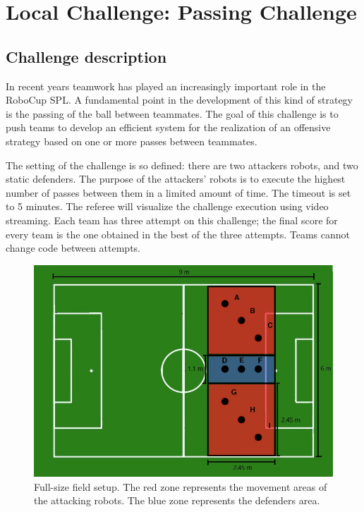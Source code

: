 \section{Local Challenge: Passing Challenge}
\label{sec:PassingChallenge}

\subsection{Challenge description}
In recent years teamwork has played an increasingly important role in the RoboCup SPL. A fundamental point in the development of this kind of strategy is the passing of the ball between teammates. The goal of this challenge is to push teams to develop an efficient system for the realization of an offensive strategy based on one or more passes between teammates. 

The setting of the challenge is so defined: there are two attackers robots, and two static defenders. The purpose of the attackers' robots is to execute the highest number of passes between them in a limited amount of time. The timeout is set to 5 minutes.
The referee will visualize the challenge execution using video streaming. 
Each team has three attempt on this challenge; the final score for every team is the one obtained in the best of the three attempts. Teams cannot change code between attempts.
\begin{figure}[ht]
\includegraphics[width=0.95\linewidth]{figs/ch_2_full.jpg}
\caption{Full-size field setup. The red zone represents the movement areas of the attacking robots. The blue zone represents the defenders area. }
\label{ch2:zone96}
\centering
\end{figure}

